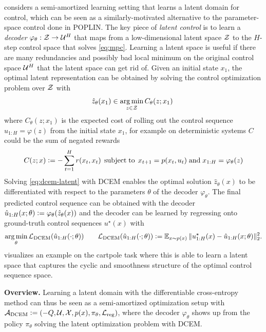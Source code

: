 \documentclass[twoside,11pt]{article}
\begin{document}
\citet{amos2019dcem} considers a semi-amortized learning setting
that learns a latent domain for control, which can be seen as
a similarly-motivated alternative to the parameter-space
control done in POPLIN.
The key piece of \emph{latent control}
is to learn a \emph{decoder} $\varphi_\theta:{\mathcal{Z}}\rightarrow {\mathcal{U}}^H$
that maps from a low-dimensional latent space ${\mathcal{Z}}$ to the
$H$-step control space that solves \cref{eq:mpc}.
Learning a latent space is useful if there are many redundancies
and possibly bad local minimum on the original control space
${\mathcal{U}}^H$ that the latent space can get rid of.
Given an initial state $x_1$, the optimal latent representation
can be obtained by solving the control optimization problem
over ${\mathcal{Z}}$ with
\begin{equation}
  \hat z_\theta(x_1)\in \operatorname*{arg\,min}_{z\in{\mathcal{Z}}} C_\theta(z; x_1)\;
  \label{eq:dcem-latent}
\end{equation}
where $C_\theta(z; x_1)$ is the expected cost of rolling out the
control sequence $u_{1:H}=\varphi(z)$ from the initial state
$x_1$, for example on deterministic systems $C$
could be the sum of negated rewards
\begin{equation}
  C(z; x) \vcentcolon= -\sum_{t=1}^H r(x_t, x_t)\;
  \operatorname*{subject\;to}\;x_{t+1}=p(x_t, u_t)\; {\rm and}\; x_{1:H}=\varphi_\theta(z)
  \label{eq:latent-cost}
\end{equation}
Solving \cref{eq:dcem-latent} with DCEM enables the optimal
solution $\hat z_\theta(x)$ to be differentiated with respect
to the parameters $\theta$ of the decoder $\varphi_\theta$.
The final predicted control sequence can be
obtained with the decoder
$\hat u_{1:H}(x; \theta)\vcentcolon= \varphi_\theta(\hat z_\theta(x))$
and the decoder can be learned by regressing
onto ground-truth control sequences $u^\star(x)$ with
\begin{equation}
  \operatorname*{arg\,min}_\theta {\mathcal{L}}_{\rm DCEM}(\hat u_{1:H}(\cdot; \theta)) \qquad {\mathcal{L}}_{\rm DCEM}(\hat u_{1:H}(\cdot; \theta))\vcentcolon= \operatorname{\mathbb{E}}_{x \sim p(x)}
  \|u^\star_{1:H}(x) - \hat u_{1:H}(x; \theta)\|_2^2.
\label{eq:dcem-loss}
\end{equation}
 visualizes an example on the cartpole task
where this is able to learn a latent space that captures the
cyclic and smoothness structure of the optimal control
sequence space.

\textbf{Overview.} Learning a latent domain with the
differentiable cross-entropy method can thus be seen
as a semi-amortized optimization setup with
${\mathcal{A}}_{\rm DCEM}\vcentcolon= (-Q, {\mathcal{U}}, {\mathcal{X}}, p(x), \pi_\theta, {\mathcal{L}}_{\rm reg})$,
where the decoder $\varphi_\theta$ shows up from
the policy $\pi_\theta$ solving the latent
optimization problem with DCEM.
\end{document}
